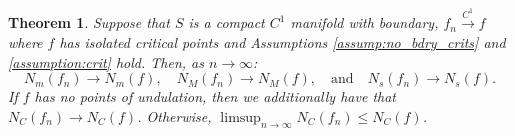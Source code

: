 \documentclass[11pt]{article}
\newcommand{\1}{\mathbf{1}}
\newtheorem{thm}{Theorem}%
\theoremstyle{definition}
\theoremstyle{remark}
\begin{document}
\begin{mdframed}
    
    \begin{thm}\label{thm:not_quite_morse}
    Suppose that $S$ is a compact $C^1$ manifold with boundary, $f_n\xrightarrow{C^1}f$ where $f$ has isolated critical points and Assumptions \ref{assump:no_bdry_crits} and \ref{assumption:crit} hold. Then, as $n\rightarrow\infty$:
    \begin{equation}\nonumber
        N_m(f_n)\rightarrow N_m(f), \quad N_M(f_n)\rightarrow N_M(f), \quad \text{and}\quad  N_s(f_n)\rightarrow N_s(f).
    \end{equation}
    If $f$ has no points of undulation, then we additionally have that $N_C(f_n)\rightarrow N_C(f)$. Otherwise, $\limsup_{n\rightarrow\infty}N_C(f_n)\leq N_C(f)$.
    \end{thm}
    \vspace{0.3cm}
\end{mdframed}
\end{document}
